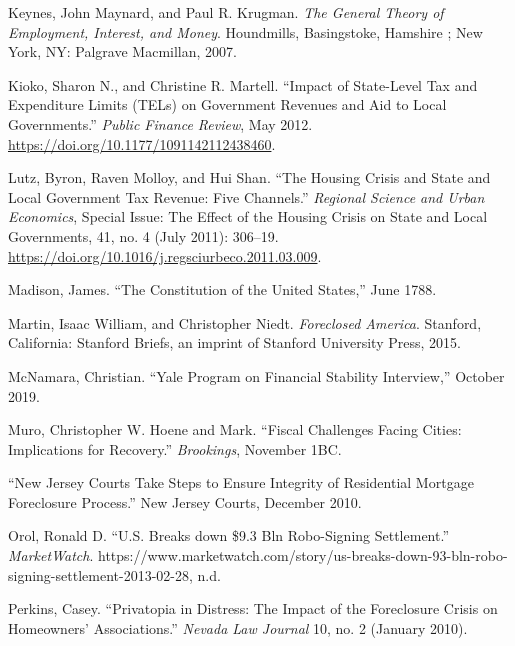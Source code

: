 \documentclass[
]{article}
\begin{document}
\leavevmode\hypertarget{ref-keynes2007general}{}%
Keynes, John Maynard, and Paul R. Krugman. \emph{The General Theory of
Employment, Interest, and Money}. Houndmills, Basingstoke, Hamshire ;
New York, NY: Palgrave Macmillan, 2007.

\leavevmode\hypertarget{ref-kioko2012impact}{}%
Kioko, Sharon N., and Christine R. Martell. ``Impact of State-Level Tax
and Expenditure Limits (TELs) on Government Revenues and Aid to Local
Governments.'' \emph{Public Finance Review}, May 2012.
\url{https://doi.org/10.1177/1091142112438460}.

\leavevmode\hypertarget{ref-lutz2011housing}{}%
Lutz, Byron, Raven Molloy, and Hui Shan. ``The Housing Crisis and State
and Local Government Tax Revenue: Five Channels.'' \emph{Regional
Science and Urban Economics}, Special Issue: The Effect of the Housing
Crisis on State and Local Governments, 41, no. 4 (July 2011): 306--19.
\url{https://doi.org/10.1016/j.regsciurbeco.2011.03.009}.

\leavevmode\hypertarget{ref-madison1788constitution}{}%
Madison, James. ``The Constitution of the United States,'' June 1788.

\leavevmode\hypertarget{ref-martinForeclosedAmerica2015}{}%
Martin, Isaac William, and Christopher Niedt. \emph{Foreclosed America}.
Stanford, California: Stanford Briefs, an imprint of Stanford University
Press, 2015.

\leavevmode\hypertarget{ref-mcnamara2019yale}{}%
McNamara, Christian. ``Yale Program on Financial Stability Interview,''
October 2019.

\leavevmode\hypertarget{ref-muro1fiscal}{}%
Muro, Christopher W. Hoene and Mark. ``Fiscal Challenges Facing Cities:
Implications for Recovery.'' \emph{Brookings}, November 1BC.

\leavevmode\hypertarget{ref-comfort2010new}{}%
``New Jersey Courts Take Steps to Ensure Integrity of Residential
Mortgage Foreclosure Process.'' New Jersey Courts, December 2010.

\leavevmode\hypertarget{ref-orolbreaks}{}%
Orol, Ronald D. ``U.S. Breaks down \$9.3 Bln Robo-Signing Settlement.''
\emph{MarketWatch}.
https://www.marketwatch.com/story/us-breaks-down-93-bln-robo-signing-settlement-2013-02-28,
n.d.

\leavevmode\hypertarget{ref-perkins2010privatopia}{}%
Perkins, Casey. ``Privatopia in Distress: The Impact of the Foreclosure
Crisis on Homeowners' Associations.'' \emph{Nevada Law Journal} 10, no.
2 (January 2010).
\end{document}
